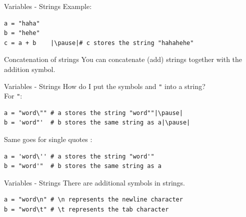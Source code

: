 \documentclass[dvipsnames, svgnames, x11names]{beamer}
\begin{document}
\begin{frame}[fragile]{Variables - Strings}
Example:
\begin{verbatim}
a = "haha"
b = "hehe"
c = a + b    |\pause|# c stores the string "hahahehe"
\end{verbatim}
\pause
\begin{block}{Concatenation of strings}
You can concatenate (add) strings together with the addition symbol.
\end{block}
\end{frame}

\begin{frame}[fragile]{Variables - Strings}
How do I put the symbols \texttt{\textquotesingle} and \texttt{"} into a string?\pause\\
For \texttt{"}:\pause
	
\begin{verbatim}
a = "word\"" # a stores the string "word""|\pause|
b = 'word"'  # b stores the same string as a|\pause|
\end{verbatim}
\vspace{1em}
Same goes for single quotes \texttt{\textquotesingle}:
\begin{verbatim}
a = 'word\'' # a stores the string "word'"
b = "word'"  # b stores the same string as a
\end{verbatim}
\end{frame}

\begin{frame}[fragile]{Variables - Strings}
There are additional symbols in strings.
\begin{verbatim}
a = "word\n" # \n represents the newline character
b = "word\t" # \t represents the tab character
\end{verbatim}
\end{frame}
\end{document}
